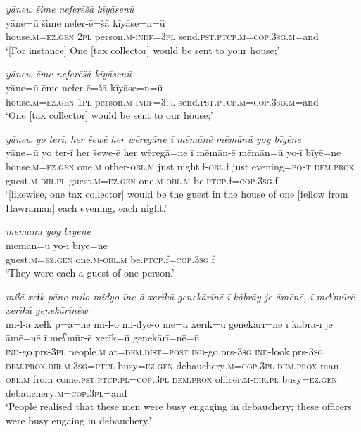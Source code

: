 \ea \label{BP.41}
\textit{yānew šime neferēšā kīyāsenū} \\ 
\gll yāne=ū šime nefer-ē=šā kīyāse=n=ū \\ 
 house\textsc{.m}\textsc{=ez.gen} \textsc{2pl} person\textsc{.m}\textsc{-indf}\textsc{=3pl} send\textsc{.pst}\textsc{.ptcp}\textsc{.m}\textsc{=cop}\textsc{.3sg}\textsc{.m}=and \\ 
\glt `[For instance] One [tax collector] would be sent to your house;'
\z 
 
\ea \label{BP.42}
\textit{yānew ēme neferēšā kīyāsenū} \\ 
\gll yāne=ū ēme nefer-ē=šā kīyāse=n=ū \\ 
 house\textsc{.m}\textsc{=ez.gen} \textsc{1pl} person\textsc{.m}\textsc{-indf}\textsc{=3pl} send\textsc{.pst}\textsc{.ptcp}\textsc{.m}\textsc{=cop}\textsc{.3sg}\textsc{.m}=and \\ 
\glt `One [tax collector] would be sent to our house;'
\z 
 
\ea \label{BP.43}
\textit{yānew yo terī, her šewē her wēregāne ī mēmānē mēmānū yoy bīyēne} \\ 
\gll yāne=ū yo ter-ī her šewe-ē her wēregā=ne ī mēmān-ē mēmān=ū yo-ī bīyē=ne \\ 
 house\textsc{.m}\textsc{=ez.gen} one\textsc{.m} other\textsc{-obl}\textsc{.m} just night.f\textsc{-obl}.f just evening\textsc{=\textsc{post}} \textsc{dem.prox} guest\textsc{.m}\textsc{-dir}\textsc{.pl} guest\textsc{.m}\textsc{=ez.gen} one\textsc{.m}\textsc{-obl}\textsc{.m} be\textsc{.ptcp}.f\textsc{=cop}\textsc{.3sg}.f \\ 
\glt `[likewise, one tax collector] would be the guest in the house of one [fellow from Hawraman]  each evening, each night.'
\z 
 
\ea \label{BP.44}
\textit{mēmānū yoy bīyēne} \\ 
\gll mēmān=ū yo-ī bīyē=ne \\ 
 guest\textsc{.m}\textsc{=ez.gen} one\textsc{.m}\textsc{-obl}\textsc{.m} be\textsc{.ptcp}.f\textsc{=cop}\textsc{.3sg}.f \\ 
\glt `They were each a guest of one person.'
\z 
 
\ea \label{BP.45}
\textit{milā xeɫk pāne milo miđyo īne ā xerīkū genekārīnē ī kābrāy je āmēnē, ī meʕmūrē xerīkū genekārīnēw} \\ 
\gll mi-l-ā xeɫk p=ā=ne mi-l-o mi-đye-o īne=ā xerīk=ū genekārī=nē ī kābrā-ī je āmē=nē ī meʕmūr-ē xerīk=ū genekārī=nē=ū \\ 
 \textsc{ind-}go.prs\textsc{-3pl} people\textsc{.m} at=\textsc{dem.dist}\textsc{=\textsc{post}} \textsc{ind-}go.prs\textsc{-3sg} \textsc{ind-}look.prs\textsc{-3sg} \textsc{dem.prox}\textsc{.dir}\textsc{.m}\textsc{.3sg}=\textsc{ptcl} busy\textsc{=ez.gen} debauchery\textsc{.m}\textsc{=cop}\textsc{.3pl} \textsc{dem.prox} man\textsc{-obl}\textsc{.m} from come\textsc{.pst}\textsc{.ptcp}\textsc{.pl}\textsc{=cop}\textsc{.3pl} \textsc{dem.prox} officer\textsc{.m}\textsc{-dir}\textsc{.pl} busy\textsc{=ez.gen} debauchery\textsc{.m}\textsc{=cop}\textsc{.3pl}=and \\ 
\glt `People realised that these men were busy engaging in debauchery; these officers were busy engaing in debauchery.'
\z 
 
